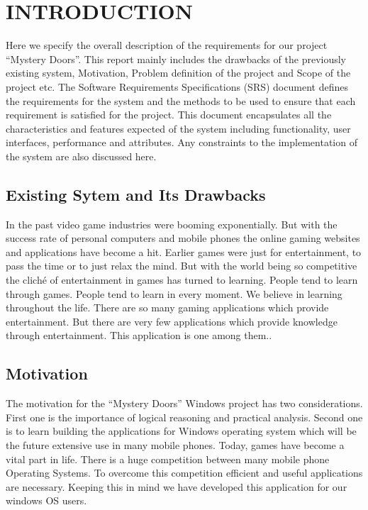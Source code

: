 \chapter{INTRODUCTION}
Here we specify the overall description of the requirements for our project “Mystery Doors”.  This report mainly  includes  the  drawbacks  of  the  previously  existing  system, Motivation, Problem  definition  of  the  project  and Scope of  the  project  etc. The Software Requirements Specifications (SRS) document defines the requirements for the system and the methods to be used to ensure that each requirement is satisfied for the project. This document encapsulates all  the  characteristics  and  features  expected  of  the  system  including  functionality,  user interfaces, performance and attributes. Any constraints to the implementation of the system are also discussed here. 

\section{Existing Sytem and Its Drawbacks}
\hspace{1cm}In the past video game industries were booming exponentially. But with the success rate of personal computers and mobile phones the online gaming websites and applications have become a hit. Earlier games were just for entertainment, to pass the time or to just relax the mind. But with the world being so competitive the cliché of entertainment in games has turned to learning. People tend to learn through games. People tend to learn in every moment. We believe in learning throughout the life. There are so many gaming applications which provide entertainment. But there are very few applications which provide knowledge through entertainment. This application is one among them.\cite{DBLP:journals/ivc/KadyrovP03}.

 
\section{Motivation}
\hspace{1cm}The motivation for the “Mystery Doors” Windows project has two considerations. First one is the importance of logical reasoning and practical analysis. Second one  is  to  learn  building  the  applications  for  Windows  operating  system  which  will  be  the future extensive use in many mobile phones. Today, games have become a vital part in life. There is a huge competition between many mobile phone Operating Systems. To overcome this competition efficient and useful applications are necessary. Keeping this in mind we have developed this application for our windows OS users.\\

